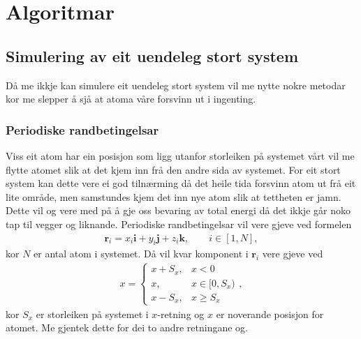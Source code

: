 \documentclass[12pt, a4paper]{article}
\theoremstyle{definition}
\newcommand{\vb}{\mathbf}
\begin{document}
\newpage


\section*{Algoritmar}

    \subsection*{Simulering av eit uendeleg stort system}
        Då me ikkje kan simulere eit uendeleg stort system vil me nytte nokre metodar kor me slepper å sjå at atoma våre forsvinn ut i ingenting.

        \subsubsection*{Periodiske randbetingelsar}
            Viss eit atom har ein 
            posisjon som ligg utanfor storleiken på systemet vårt vil me flytte atomet slik at det kjem inn frå den andre sida av systemet. For eit stort system kan dette 
            vere ei god tilnærming då det heile tida forsvinn atom ut frå eit lite område, men samstundes kjem det inn nye atom slik at tettheten er jamn. Dette vil og vere med
            på å gje oss bevaring av total energi då det ikkje går noko tap til vegger og liknande. Periodiske randbetingelsar vil vere gjeve ved formelen
            \begin{align*}
                \vb{r}_i = x_i\vb{i} + y_i\vb{j} + z_i\vb{k}, \qquad i \in [1, N],
            \end{align*}
            kor $N$ er antal atom i systemet. Då vil kvar komponent i $\vb{r}_i$ vere gjeve ved
            \begin{align*}
                x = 
                \begin{cases}
                    x + S_x, & x < 0 \\
                    x, & x \in [0, S_x) \\
                    x - S_x, & x \geq S_x
                \end{cases},
            \end{align*}
            kor $S_x$ er storleiken på systemet i $x$-retning og $x$ er noverande posisjon for atomet. Me gjentek dette for dei to andre retningane og.
\end{document}

